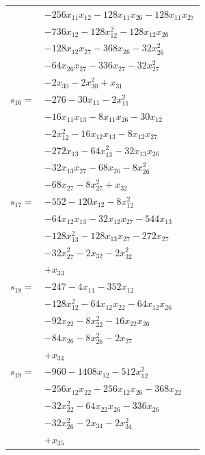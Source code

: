 \begin{longtable}{@{}r@{\;}l@{}}
 & \(\displaystyle -256x_{11}x_{12} -128x_{11}x_{26} -128x_{11}x_{27}\) \\
 & \(\displaystyle -736x_{12} -128x_{12}^{2} -128x_{12}x_{26}\) \\
 & \(\displaystyle -128x_{12}x_{27} -368x_{26} -32x_{26}^{2}\) \\
 & \(\displaystyle -64x_{26}x_{27} -336x_{27} -32x_{27}^{2}\) \\
 & \(\displaystyle -2x_{30} -2x_{30}^{2} +x_{31}\) \\[3pt]
\(s_{16}=\) & \(\displaystyle -276 -30x_{11} -2x_{11}^{2}\) \\
 & \(\displaystyle -16x_{11}x_{13} -8x_{11}x_{26} -30x_{12}\) \\
 & \(\displaystyle -2x_{12}^{2} -16x_{12}x_{13} -8x_{12}x_{27}\) \\
 & \(\displaystyle -272x_{13} -64x_{13}^{2} -32x_{13}x_{26}\) \\
 & \(\displaystyle -32x_{13}x_{27} -68x_{26} -8x_{26}^{2}\) \\
 & \(\displaystyle -68x_{27} -8x_{27}^{2} +x_{32}\) \\[3pt]
\(s_{17}=\) & \(\displaystyle -552 -120x_{12} -8x_{12}^{2}\) \\
 & \(\displaystyle -64x_{12}x_{13} -32x_{12}x_{27} -544x_{13}\) \\
 & \(\displaystyle -128x_{13}^{2} -128x_{13}x_{27} -272x_{27}\) \\
 & \(\displaystyle -32x_{27}^{2} -2x_{32} -2x_{32}^{2}\) \\
 & \(\displaystyle +x_{33}\) \\[3pt]
\(s_{18}=\) & \(\displaystyle -247 -4x_{11} -352x_{12}\) \\
 & \(\displaystyle -128x_{12}^{2} -64x_{12}x_{22} -64x_{12}x_{26}\) \\
 & \(\displaystyle -92x_{22} -8x_{22}^{2} -16x_{22}x_{26}\) \\
 & \(\displaystyle -84x_{26} -8x_{26}^{2} -2x_{27}\) \\
 & \(\displaystyle +x_{34}\) \\[3pt]
\(s_{19}=\) & \(\displaystyle -960 -1408x_{12} -512x_{12}^{2}\) \\
 & \(\displaystyle -256x_{12}x_{22} -256x_{12}x_{26} -368x_{22}\) \\
 & \(\displaystyle -32x_{22}^{2} -64x_{22}x_{26} -336x_{26}\) \\
 & \(\displaystyle -32x_{26}^{2} -2x_{34} -2x_{34}^{2}\) \\
 & \(\displaystyle +x_{35}\) \\[3pt]

\end{longtable}

